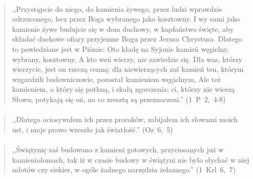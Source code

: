 \documentclass[10pt,a4paper,oneside]{article}
\begin{document}
\paragraph{}
\begin{quote}
,,Przystąpcie do niego, do kamienia żywego, przez ludzi wprawdzie odrzuconego, lecz przez Boga wybranego jako kosztowny. I wy sami jako kamienie żywe budujcie się w dom duchowy, w kapłaństwo święte, aby składać duchowe ofiary przyjemne Bogu przez Jezusa Chrystusa. Dlatego to powiedziane jest w Piśmie: Oto kładę na Syjonie kamień węgielny, wybrany, kosztowny, A kto weń wierzy, nie zawiedzie się. Dla was, którzy wierzycie, jest on rzeczą cenną; dla niewierzących zaś kamień ten, którym wzgardzili budowniczowie, pozostał kamieniem węgielnym, Ale też kamieniem, o który się potkną, i skałą zgorszenia; ci, którzy nie wierzą Słowu, potykają się oń, na co zresztą są przeznaczeni.'' \mbox{(1 P 2, 4-8)}
\end{quote}
\paragraph{}
\begin{quote}
,,Dlatego ociosywałem ich przez proroków, zabijałem ich słowami moich ust, i moje prawo wzeszło jak światłość.'' \mbox{(Oz 6, 5)}
\end{quote}
\paragraph{}
\begin{quote}
,,Świątynię zaś budowano z kamieni gotowych, przyciosanych już w kamieniołomach, tak iż w czasie budowy w świątyni nie było słychać w niej młotów czy siekier, w ogóle żadnego narzędzia żelaznego.'' \mbox{(1 Krl 6, 7)}
\end{quote}
\end{document}
